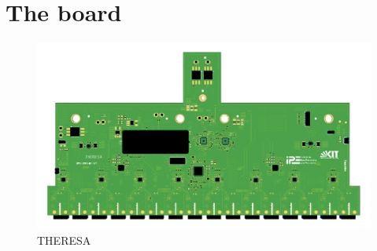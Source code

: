 \section{The board}
\begin{figure}[H]
	\centering
	\includegraphics[width = \textwidth]{chap/06-conclusion/img/board}
	\caption{THERESA}
	\label{fig:board}
\end{figure}
